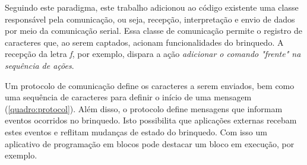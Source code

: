 Seguindo este paradigma, este trabalho adicionou ao código existente uma classe responsável pela comunicação, ou seja, recepção, interpretação e envio de dados por meio da comunicação serial. Essa classe de comunicação permite o registro de caracteres que, ao serem captados, acionam funcionalidades do brinquedo. A recepção da letra \textit{f}, por exemplo, dispara a ação \textit{adicionar o comando "frente" na sequência de ações}.

Um protocolo de comunicação define os caracteres a serem enviados, bem como uma sequência de caracteres para definir o início de uma mensagem (\autoref{quadro:protocol}). Além disso, o protocolo define mensagens que informam eventos ocorridos no brinquedo. Isto possibilita que aplicações externas recebam estes eventos e reflitam mudanças de estado do brinquedo. Com isso um aplicativo de programação em blocos pode destacar um bloco em execução, por exemplo.

